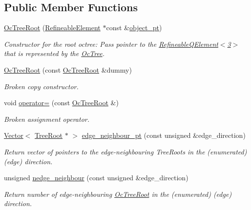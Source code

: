 \subsection*{Public Member Functions}
\begin{DoxyCompactItemize}
\item 
\hyperlink{classoomph_1_1OcTreeRoot_a594278fd254e72415e1523b1b8e7273d}{Oc\+Tree\+Root} (\hyperlink{classoomph_1_1RefineableElement}{Refineable\+Element} $\ast$const \&\hyperlink{classoomph_1_1Tree_a2f2eeb0f1dd161f696cccc652974ff4c}{object\+\_\+pt})
\begin{DoxyCompactList}\small\item\em Constructor for the root octree\+: Pass pointer to the \hyperlink{classoomph_1_1RefineableQElement_3_013_01_4}{Refineable\+Q\+Element$<$3$>$} that is represented by the \hyperlink{classoomph_1_1OcTree}{Oc\+Tree}. \end{DoxyCompactList}\item 
\hyperlink{classoomph_1_1OcTreeRoot_aa32ff5989a11da4c0a6f884f81833ef9}{Oc\+Tree\+Root} (const \hyperlink{classoomph_1_1OcTreeRoot}{Oc\+Tree\+Root} \&dummy)
\begin{DoxyCompactList}\small\item\em Broken copy constructor. \end{DoxyCompactList}\item 
void \hyperlink{classoomph_1_1OcTreeRoot_a9301f0c4839b8e277822ab0d860f4d11}{operator=} (const \hyperlink{classoomph_1_1OcTreeRoot}{Oc\+Tree\+Root} \&)
\begin{DoxyCompactList}\small\item\em Broken assignment operator. \end{DoxyCompactList}\item 
\hyperlink{classoomph_1_1Vector}{Vector}$<$ \hyperlink{classoomph_1_1TreeRoot}{Tree\+Root} $\ast$ $>$ \hyperlink{classoomph_1_1OcTreeRoot_acef513b8401e5fd32d1311bdebe86f45}{edge\+\_\+neighbour\+\_\+pt} (const unsigned \&edge\+\_\+direction)
\begin{DoxyCompactList}\small\item\em Return vector of pointers to the edge-\/neighbouring Tree\+Roots in the (enumerated) (edge) direction. \end{DoxyCompactList}\item 
unsigned \hyperlink{classoomph_1_1OcTreeRoot_add3c1de4903d2db75d19274719912ea3}{nedge\+\_\+neighbour} (const unsigned \&edge\+\_\+direction)
\begin{DoxyCompactList}\small\item\em Return number of edge-\/neighbouring \hyperlink{classoomph_1_1OcTreeRoot}{Oc\+Tree\+Root} in the (enumerated) (edge) direction. \end{DoxyCompactList}\item 

\end{DoxyCompactItemize}
